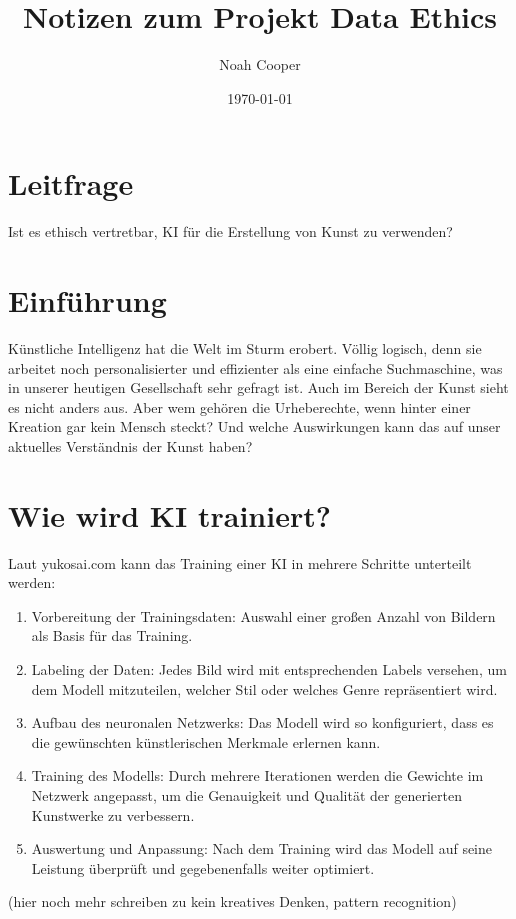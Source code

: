 \documentclass{article}
\title{Notizen zum Projekt Data Ethics}
\author{Noah Cooper}
\date{\today}
\begin{document}
\maketitle


\tableofcontents

\newpage

\section{Leitfrage}
    Ist es ethisch vertretbar, KI für die Erstellung von Kunst zu verwenden?

\section{Einführung}
    Künstliche Intelligenz hat die Welt im Sturm erobert. Völlig logisch, denn sie arbeitet noch 
    personalisierter und effizienter als eine einfache Suchmaschine, was in unserer heutigen Gesellschaft 
    sehr gefragt ist. Auch im Bereich der Kunst sieht es nicht anders aus. Aber wem gehören die Urheberechte, wenn hinter einer Kreation gar kein Mensch steckt? Und welche Auswirkungen kann das auf unser aktuelles Verständnis der Kunst haben?


\section{Wie wird KI trainiert?}
    Laut yukosai.com kann das Training einer KI in mehrere Schritte unterteilt werden:
    \begin{enumerate}
        \item Vorbereitung der Trainingsdaten: Auswahl einer großen Anzahl von Bildern als Basis für das Training.
        \item Labeling der Daten: Jedes Bild wird mit entsprechenden Labels versehen, um dem Modell mitzuteilen, welcher Stil oder welches Genre repräsentiert wird.
        \item Aufbau des neuronalen Netzwerks: Das Modell wird so konfiguriert, dass es die gewünschten künstlerischen Merkmale erlernen kann.
        \item Training des Modells: Durch mehrere Iterationen werden die Gewichte im Netzwerk angepasst, um die Genauigkeit und Qualität der generierten Kunstwerke zu verbessern.
        \item Auswertung und Anpassung: Nach dem Training wird das Modell auf seine Leistung überprüft und gegebenenfalls weiter optimiert.
    \end{enumerate}
    (hier noch mehr schreiben zu kein kreatives Denken, pattern recognition)
    
\end{document}
